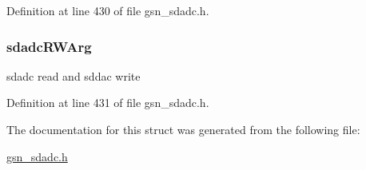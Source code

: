 Definition at line 430 of file gsn\_\-sdadc.h.

\hypertarget{a00212_a425dd6f43085c4346c99f9454f569dbf}{
\subsubsection[{sdadcRWArg}]{ {\bf sdadcRWArg}}}
\label{a00212_a425dd6f43085c4346c99f9454f569dbf}
sdadc read and sddac write 

Definition at line 431 of file gsn\_\-sdadc.h.



The documentation for this struct was generated from the following file:\begin{DoxyCompactItemize}
\item 
\hyperlink{a00583}{gsn\_\-sdadc.h}\end{DoxyCompactItemize}
